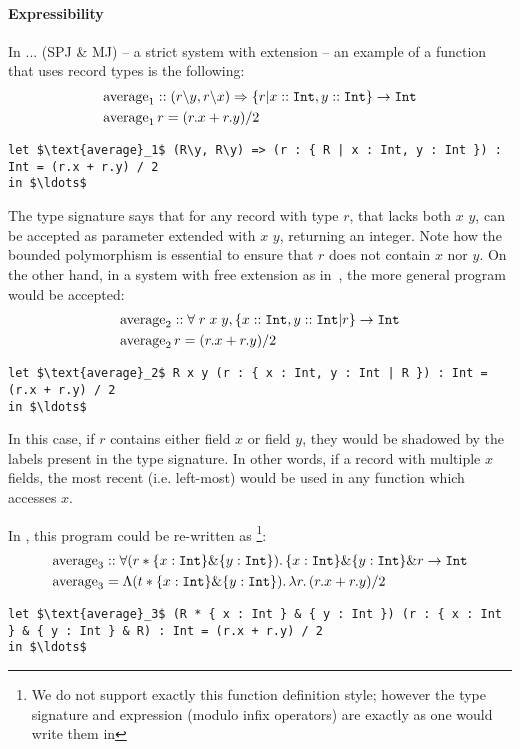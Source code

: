 \paragraph{Expressibility}
In ... (SPJ \& MJ) -- a strict system with extension -- an example of a function that uses 
record types is the following:
\begin{align*}
&\text{average}_1 :: (r \backslash y, r \backslash x) \Rightarrow \{r | x :: \texttt{Int}, y :: \texttt{Int}\} \rightarrow \texttt{Int} \\
&\text{average}_1 \, r = (r.x + r.y) / 2
\end{align*}
\begin{lstlisting}[mathescape=true]
let $\text{average}_1$ (R\y, R\y) => (r : { R | x : Int, y : Int }) : Int = (r.x + r.y) / 2 
in $\ldots$ 
\end{lstlisting}

The type signature says that for any record with type $r$, that lacks both $x$ $y$, can be accepted
as parameter extended with $x$ $y$, returning an integer.
Note how the bounded polymorphism is essential to ensure that $r$ does not contain $x$ nor $y$.
On the other hand, in a system with free extension as in~\cite{leijen2005extensible}, 
the more general program would be accepted:
\begin{align*}
&\text{average}_2 :: \forall \; r \;x \; y, \{ x :: \texttt{Int}, y :: \texttt{Int} | r \} \rightarrow \texttt{Int} \\
&\text{average}_2 \, r = (r.x + r.y) / 2
\end{align*}
\begin{lstlisting}[mathescape=true]
let $\text{average}_2$ R x y (r : { x : Int, y : Int | R }) : Int = (r.x + r.y) / 2 
in $\ldots$ 
\end{lstlisting}

In this case, if $r$ contains either field $x$ or field $y$, they would be shadowed by the labels 
present in the type signature.
In other words, if a record with multiple $x$ fields, the most recent (i.e. left-most) would be used 
in any function which accesses $x$.

In \name, this program could be re-written as
\footnote{We do not support exactly this function definition style; 
however the type signature and expression (modulo infix operators) are exactly as one would write them
in \name}:
\begin{align*}
&\text{average}_3 :: \forall (r * \{ x : \texttt{Int} \} \& \{ y : \texttt{Int} \}).\, \{ x : \texttt{Int} \} \& \{ y : \texttt{Int} \} \& r \rightarrow \texttt{Int} \\
&\text{average}_3 = 
{\Lambda (t * \{ x : \texttt{Int} \} \& \{ y : \texttt{Int} \}).\, \lambda r.\, (r.x + r.y) / 2}
\end{align*}
\begin{lstlisting}[mathescape=true]
let $\text{average}_3$ (R * { x : Int } & { y : Int }) (r : { x : Int } & { y : Int } & R) : Int = (r.x + r.y) / 2 
in $\ldots$ 
\end{lstlisting}


